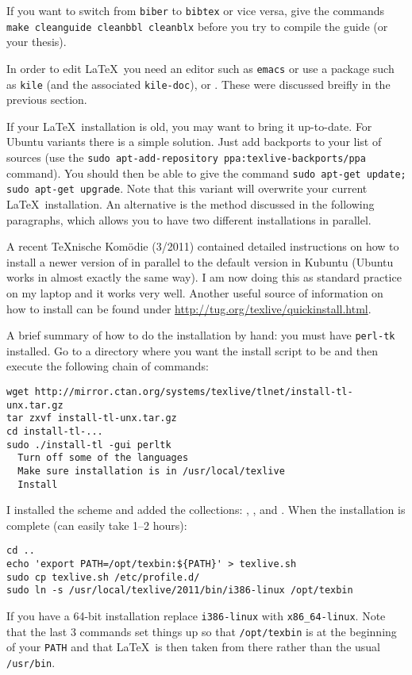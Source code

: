 If you want to switch from \texttt{biber} to
\texttt{bibtex} or vice versa, give the commands
\texttt{make cleanguide cleanbbl cleanblx} before you try to compile
the guide (or your thesis).

In order to edit \LaTeX\ you need an editor such as \texttt{emacs} or
use a package such as \texttt{kile} (and the associated
\texttt{kile-doc}), \TeXstudio or \TeXmaker. These were discussed
breifly in the previous section.

If your \LaTeX\ installation is old, you may want to bring it
up-to-date.  For Ubuntu variants there is a simple solution. Just add
\TeXLive backports to your list of sources (use the \texttt{sudo
  apt-add-repository ppa:texlive-backports/ppa} command). You should
then be able to give the command \texttt{sudo apt-get update; sudo
  apt-get upgrade}. Note that this variant will overwrite your current
\LaTeX\ installation. An alternative is the method discussed in the
following paragraphs, which allows you to have two different installations in
parallel.

A recent \TeX nische Komödie (3/2011) contained detailed instructions on
how to install a newer version of \TeXLive in parallel to the
default version in Kubuntu (Ubuntu works in almost exactly the
same way). I am now doing this as standard practice on my laptop
and it works very well. Another useful source of information on how to
install \TeXLive can be found under
\url{http://tug.org/texlive/quickinstall.html}.

A brief summary of how to do the installation by hand: you must have
\texttt{perl-tk} installed.  Go to a directory where you want the
install script to be and then execute the following chain of commands:
\begin{verbatim}
wget http://mirror.ctan.org/systems/texlive/tlnet/install-tl-unx.tar.gz
tar zxvf install-tl-unx.tar.gz
cd install-tl-...
sudo ./install-tl -gui perltk
  Turn off some of the languages
  Make sure installation is in /usr/local/texlive
  Install
\end{verbatim}
I installed the scheme  and added the
collections: , ,  and
.  When the
installation is complete (can easily take \numrange{1}{2} hours):
\begin{verbatim}
cd ..
echo 'export PATH=/opt/texbin:${PATH}' > texlive.sh
sudo cp texlive.sh /etc/profile.d/
sudo ln -s /usr/local/texlive/2011/bin/i386-linux /opt/texbin
\end{verbatim}
If you have a 64-bit installation replace \texttt{i386-linux} with
\texttt{x86\_64-linux}. Note that the last 3 commands set things up so
that \texttt{/opt/texbin} is at the beginning of your \texttt{PATH}
and that \LaTeX\ is then taken from there rather than the usual
\texttt{/usr/bin}.

